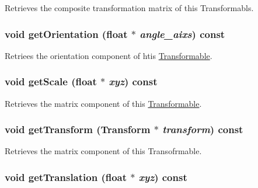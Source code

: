 Retrieves the composite transformation matrix of this Transformabls. \hypertarget{classm3g_1_1Transformable_06125ab0d85ef8c5c7ace9ced04993f3}{
\subsubsection[{getOrientation}]{\setlength{\rightskip}{0pt plus 5cm}void getOrientation (float $\ast$ {\em angle\_\-aixs}) const}}
\label{classm3g_1_1Transformable_06125ab0d85ef8c5c7ace9ced04993f3}


Retriees the orientation component of htis \hyperlink{classm3g_1_1Transformable}{Transformable}. \hypertarget{classm3g_1_1Transformable_b8a2dd11d0ba90e138625eb86a6a6083}{
\subsubsection[{getScale}]{\setlength{\rightskip}{0pt plus 5cm}void getScale (float $\ast$ {\em xyz}) const}}
\label{classm3g_1_1Transformable_b8a2dd11d0ba90e138625eb86a6a6083}


Retrieves the matrix component of this \hyperlink{classm3g_1_1Transformable}{Transformable}. \hypertarget{classm3g_1_1Transformable_73f387f99c527b382c8aaa54b8af6ed6}{
\subsubsection[{getTransform}]{\setlength{\rightskip}{0pt plus 5cm}void getTransform ({\bf Transform} $\ast$ {\em transform}) const}}
\label{classm3g_1_1Transformable_73f387f99c527b382c8aaa54b8af6ed6}


Retrieves the matrix component of this Transofrmable. \hypertarget{classm3g_1_1Transformable_d8aec42959fecc3d76f9539d3afa3c8d}{
\subsubsection[{getTranslation}]{\setlength{\rightskip}{0pt plus 5cm}void getTranslation (float $\ast$ {\em xyz}) const}}
\label{classm3g_1_1Transformable_d8aec42959fecc3d76f9539d3afa3c8d}


